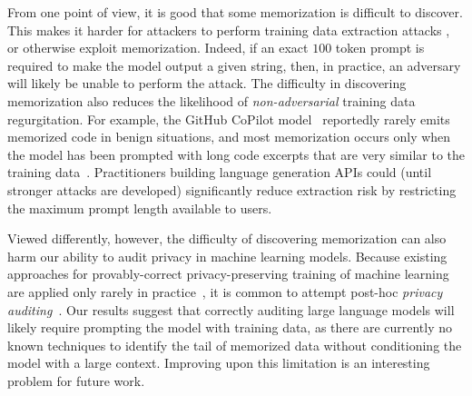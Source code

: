 From one point of view, it is good that some memorization is difficult to discover.
This makes it harder for attackers to perform training data extraction attacks \citep{carlini2020extracting},
or otherwise exploit memorization.
Indeed, if an exact $100$ token prompt is required to make the model output a given string, then, in practice, an adversary will likely be unable to perform the attack.
%
The difficulty in discovering memorization also reduces the likelihood of \emph{non-adversarial} training data regurgitation.
For example, the GitHub CoPilot model~\citep{chen2021evaluating} reportedly rarely emits memorized code in benign situations, and most memorization occurs only when the model has been prompted with long code excerpts that are very similar to the training data~\citep{ziegler2021copilot}.
Practitioners building language generation APIs could (until stronger attacks are developed) significantly reduce extraction risk by restricting the maximum prompt length available to users.

Viewed differently, however, the difficulty of discovering memorization
can also harm our ability to audit privacy in machine learning models.
%
Because existing approaches for provably-correct privacy-preserving training of machine learning are applied only rarely in practice~\citep{abadi2016deep, thakkar2020understanding, ramaswamy2020training},
it is common to attempt post-hoc \emph{privacy auditing}~\citep{jayaraman2019evaluating, jagielski2020auditing, nasr2021adversary}.
%
Our results suggest that correctly auditing large language models will likely require prompting the model with training data, as there are currently no known techniques to identify the tail of memorized data without conditioning the model with a large context.
%
Improving upon this limitation is an interesting problem for future work.


